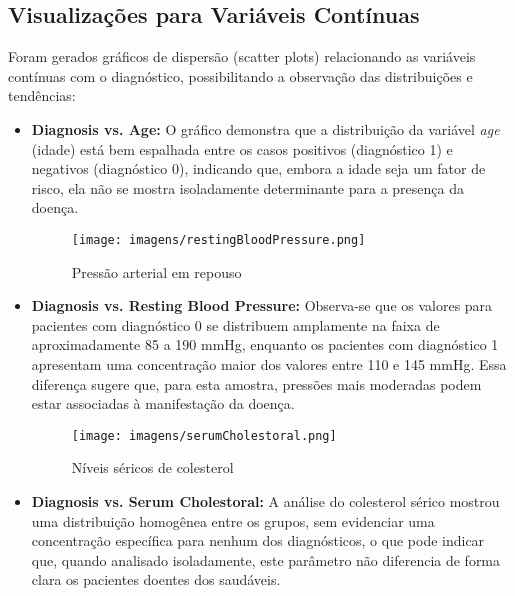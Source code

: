 \documentclass[conference]{IEEEtran}
\begin{document}
\subsection{Visualizações para Variáveis Contínuas}
Foram gerados gráficos de dispersão (scatter plots) relacionando as variáveis contínuas com o diagnóstico, possibilitando a observação das distribuições e tendências:
\begin{itemize}
    \begin{figure}[htbp]
        \centering
        \texttt{[image: imagens/age.png]}
        \caption{Distribuição de idades dos pacientes}
        \label{idade}
    \end{figure}
    \item \textbf{Diagnosis vs. Age:} O gráfico demonstra que a distribuição da variável \textit{age} (idade) está bem espalhada entre os casos positivos (diagnóstico 1) e negativos (diagnóstico 0), indicando que, embora a idade seja um fator de risco, ela não se mostra isoladamente determinante para a presença da doença.
    
    \begin{figure}[htbp]
        \centering
        \texttt{[image: imagens/restingBloodPressure.png]}
        \caption{Pressão arterial em repouso}
        \label{pressao_repouso}
    \end{figure}
    \item \textbf{Diagnosis vs. Resting Blood Pressure:} Observa-se que os valores para pacientes com diagnóstico 0 se distribuem amplamente na faixa de aproximadamente 85 a 190 mmHg, enquanto os pacientes com diagnóstico 1 apresentam uma concentração maior dos valores entre 110 e 145 mmHg. Essa diferença sugere que, para esta amostra, pressões mais moderadas podem estar associadas à manifestação da doença.
    
    \begin{figure}[htbp]
        \centering
        \texttt{[image: imagens/serumCholestoral.png]}
        \caption{Níveis séricos de colesterol}
        \label{colesterol}
    \end{figure}
    \item \textbf{Diagnosis vs. Serum Cholestoral:} A análise do colesterol sérico mostrou uma distribuição homogênea entre os grupos, sem evidenciar uma concentração específica para nenhum dos diagnósticos, o que pode indicar que, quando analisado isoladamente, este parâmetro não diferencia de forma clara os pacientes doentes dos saudáveis.
    

\end{itemize}
\end{document}
